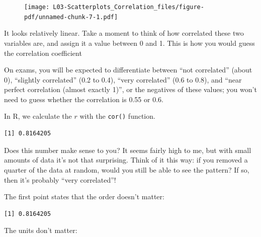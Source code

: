\documentclass[
  letterpaper,
  DIV=11,
  numbers=noendperiod]{scrreprt}
\newenvironment{Shaded}{\begin{snugshade}}{\end{snugshade}}
\newcommand{\FunctionTok}[1]{\textcolor[rgb]{0.28,0.35,0.67}{#1}}
\newcommand{\NormalTok}[1]{\textcolor[rgb]{0.00,0.23,0.31}{#1}}
\newcommand{\SpecialCharTok}[1]{\textcolor[rgb]{0.37,0.37,0.37}{#1}}
\begin{document}
\begin{figure}[H]

{\centering \texttt{[image: L03-Scatterplots\_Correlation\_files/figure-pdf/unnamed-chunk-7-1.pdf]}

}

\end{figure}

It looks relatively linear. Take a moment to think of how correlated
these two variables are, and assign it a value between 0 and 1. This is
how you would guess the correlation coefficient

On exams, you will be expected to differentiate between ``not
correlated'' (about 0), ``slightly correlated'' (0.2 to 0.4), ``very
correlated'' (0.6 to 0.8), and ``near perfect correlation (almost
exactly 1)'', or the negatives of these values; you won't need to guess
whether the correlation is 0.55 or 0.6.

In R, we calculate the \(r\) with the \texttt{cor()} function.

\begin{Shaded}
\end{Shaded}

\begin{verbatim}
[1] 0.8164205
\end{verbatim}

Does this number make sense to you? It seems fairly high to me, but with
small amounts of data it's not that surprising. Think of it this way: if
you removed a quarter of the data at random, would you still be able to
see the pattern? If so, then it's probably ``very correlated''!

The first point states that the order doesn't matter:

\begin{Shaded}
\end{Shaded}

\begin{verbatim}
[1] 0.8164205
\end{verbatim}

The units don't matter:
\end{document}
